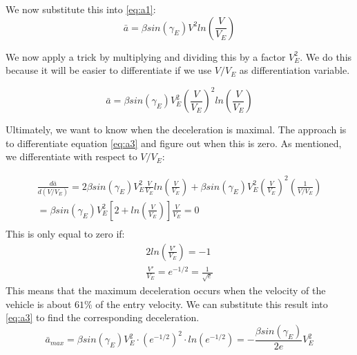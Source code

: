 We now substitute this into \ref{eq:a1}:
\begin{equation}
    \bar{a} = \beta sin(\gamma_E) V^2 ln \left( \frac{V}{V_E} \right)
\end{equation}

We now apply a trick by multiplying and dividing this by a factor $V_E^2$. We do this because it will be easier to differentiate if we use $V/V_E$ as differentiation variable.

\begin{equation} \label{eq:a3}
    \bar{a} = \beta sin(\gamma_E) V_E^2 \left( \frac{V}{V_E} \right)^2 ln \left( \frac{V}{V_E} \right)
\end{equation}

Ultimately, we want to know when the deceleration is maximal. The approach is to differentiate equation \ref{eq:a3} and figure out when this is zero. As mentioned, we differentiate with respect to $V/V_E$:

\begin{equation} \label{eq:dadv}
\begin{split}
    \frac{d\bar{a}}{d(V/V_E)} = 2 \beta sin(\gamma_E) V_E^2 \frac{V}{V_E} ln \left( \frac{V}{V_E} \right) + \beta sin(\gamma_E) V_E^2 \left( \frac{V}{V_E} \right)^2 \left( \frac{1}{V/V_E} \right) \\
    = \beta sin(\gamma_E) V_E^2 \left[ 2 + ln \left( \frac{V}{V_E} \right) \right] \frac{V}{V_E} = 0 \\
\end{split}
\end{equation}
This is only equal to zero if:
\begin{equation}
\begin{split}
    2 ln \left( \frac{V'}{V_E} \right) = -1 \\
    \frac{V'}{V_E} = e^{-1/2} = \frac{1}{\sqrt{e}}
\end{split}
\end{equation}
This means that the maximum deceleration occurs when the velocity of the vehicle is about $61\%$ of the entry velocity. We can substitute this result into \ref{eq:a3} to find the corresponding deceleration.
\begin{equation} \label{eq:a4}
    \bar{a}_{max} = \beta sin(\gamma_E) V_E^2 \cdot (e^{-1/2})^2 \cdot ln (e^{-1/2}) = -\frac{\beta sin(\gamma_E)}{2 e} V_E^2
\end{equation}

